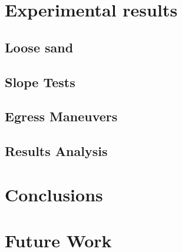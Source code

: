 \documentclass[a4paper,twocolumn]{esapub2005} %
\begin{document}

\section{Experimental results}

\subsection{Loose sand}
\subsection{Slope Tests}
\subsection{Egress Maneuvers}
\subsection{Results Analysis}

\section{Conclusions}

\section{Future Work}


\vspace{-3 mm}




\end{document}
